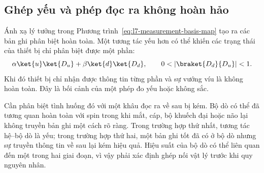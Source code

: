\begin{classroomqa}
\end{classroomqa}

\begin{classroomqa}
\end{classroomqa}

\subsection{Ghép yếu và phép đọc ra không hoàn hảo}

Ánh xạ lý tưởng trong Phương trình~\eqref{eq:l7-measurement-basis-map} tạo ra các bản ghi phân biệt hoàn toàn. Một tương tác yếu hơn có thể khiến các trạng thái của thiết bị chỉ phân biệt được một phần:
\begin{equation}
\alpha\ket{u}\ket{D_u}
+\beta\ket{d}\ket{D_d},
\qquad
0<|\braket{D_d}{D_u}|<1.
\label{eq:l7-weak-measurement}
\end{equation}
Khi đó thiết bị chỉ nhận được thông tin từng phần và sự vướng víu là không hoàn toàn. Đây là bối cảnh của một phép đo yếu hoặc không sắc.

Cần phân biệt tình huống đó với một khâu đọc ra về sau bị kém. Bộ dò có thể đã tương quan hoàn toàn với spin trong khi mắt, cáp, bộ khuếch đại hoặc não lại không truyền bản ghi một cách rõ ràng. Trong trường hợp thứ nhất, tương tác hệ--bộ dò là yếu; trong trường hợp thứ hai, một bản ghi tốt đã có ở bộ dò nhưng sự truyền thông tin về sau lại kém hiệu quả. Hiệu suất của bộ dò có thể liên quan đến một trong hai giai đoạn, vì vậy phải xác định ghép nối vật lý trước khi quy nguyên nhân.

